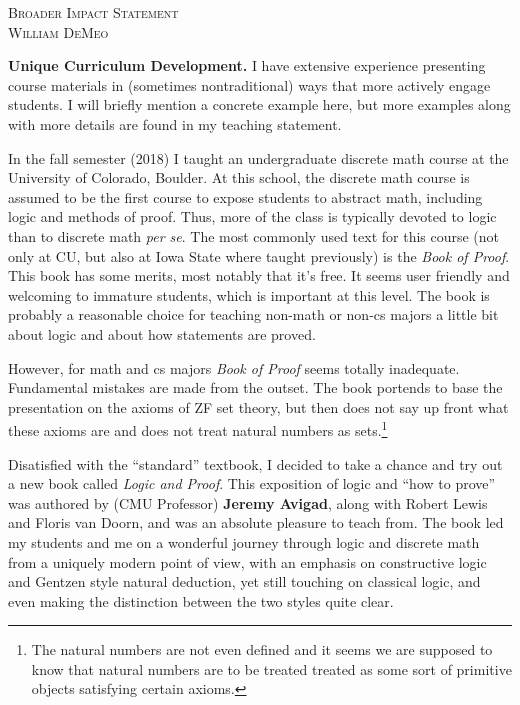 \documentclass[12pt]{amsart}
\theoremstyle{plain} \numberwithin{equation}{section}
\theoremstyle{definition}
\begin{document}
\begin{center}
 {\large {\scshape Broader Impact Statement}}\\[5pt]
  {\scshape William DeMeo}
\end{center}
\thispagestyle{empty}
\vskip1cm

\noindent \textbf{Unique Curriculum Development.} I have extensive experience presenting course materials in (sometimes nontraditional) ways that more actively engage students.  I will briefly mention a concrete example here, but more examples along with more details are found in my teaching statement.

In the fall semester (2018) I taught an undergraduate discrete math course at the University of Colorado, Boulder. At this school, the discrete math course is assumed to be the first course to expose students to abstract math, including logic and methods of proof.  Thus, more of the class is typically devoted to logic than to discrete math {\it per se}.  
The most commonly used text for this course (not only at CU, but also at Iowa State where taught previously) is the \emph{Book of Proof}.  This book has some merits, most notably that it's free.  It seems user friendly and welcoming to immature students, which is important at this level. The book is probably a reasonable choice for teaching non-math or non-cs majors a little bit about logic and about how statements are proved.  

However, for math and cs majors \emph{Book of Proof} seems totally inadequate.  Fundamental mistakes are made from the outset. The book portends to base the presentation on the axioms of ZF set theory, but then does not say up front what these axioms are and does not treat natural numbers as sets.\footnote{The natural numbers are not even defined and it seems we are supposed to know that natural numbers are to be treated treated as some sort of primitive objects satisfying certain axioms.}

Disatisfied with the ``standard'' textbook, I decided to take a chance and try out a new book called \textit{Logic and Proof}. This exposition of logic and ``how to prove'' was authored by (CMU Professor) {\bf Jeremy Avigad}, along with Robert Lewis and Floris van Doorn, and was an absolute pleasure to teach from. The book led my students and me on a wonderful journey through logic and discrete math from a uniquely modern point of view, with an emphasis on constructive logic and Gentzen style natural deduction, yet still touching on classical logic, and even making the distinction between the two styles quite clear.  
\end{document}
